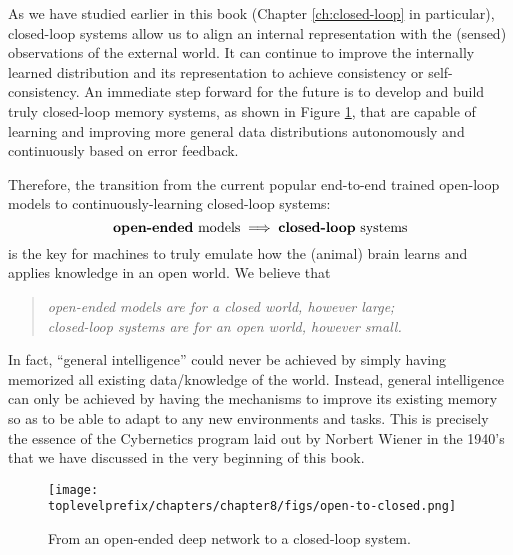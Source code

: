 \documentclass[../../book-main.tex]{subfiles}
\begin{document}
As we have studied earlier in this book (Chapter \ref{ch:closed-loop} in particular), closed-loop systems allow us to align an internal representation with the (sensed) observations of the external world. It can continue to improve the internally learned distribution and its representation to achieve consistency or self-consistency. An immediate step forward for the future is to develop and build truly closed-loop memory systems, as shown in Figure \ref{fig:open-to-closed}, that are capable of learning and improving more general data distributions autonomously and continuously based on error feedback. 

Therefore, the transition from the current popular end-to-end trained open-loop models to continuously-learning closed-loop systems:
\begin{equation}
   \mbox{\textbf{open-ended} models} \; \Longrightarrow \; 
   \mbox{\textbf{closed-loop} systems}
\end{equation}
is the key for machines to truly emulate how the (animal) brain learns and applies knowledge in an open world. We believe that
\begin{quote}
\begin{center}
        {\em open-ended models are for a closed world, however large; \\ closed-loop systems are for an open world, however small.}
\end{center}
\end{quote}
In fact, ``general intelligence'' could never be achieved by simply having memorized all existing data/knowledge of the world. Instead, general intelligence can only be achieved by having the mechanisms to improve its existing memory so as to be able to adapt to any new environments and tasks. This is precisely the essence of the Cybernetics program laid out by Norbert Wiener in the 1940's that we have discussed in the very beginning of this book.

\begin{figure}[t]
    \centering    
    \texttt{[image: \\toplevelprefix/chapters/chapter8/figs/open-to-closed.png]}
    \caption{From an open-ended deep network to a closed-loop system.}
    \label{fig:open-to-closed}
\end{figure}
\end{document}
